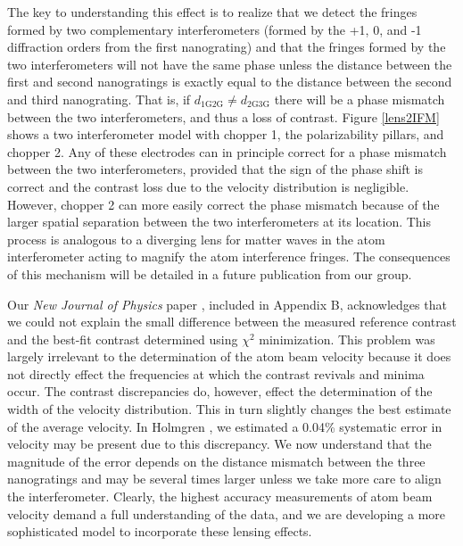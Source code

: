 The key to understanding this effect is to realize that we detect the fringes formed by two complementary interferometers (formed by the +1, 0, and -1 diffraction orders from the first nanograting) and that the fringes formed by the two interferometers will not have the same phase unless the distance between the first and second nanogratings is exactly equal to the distance between the second and third nanograting. That is, if $d_\textrm{1G2G} \neq d_\textrm{2G3G}$ there will be a phase mismatch between the two interferometers, and thus a loss of contrast. Figure \ref{lens2IFM} shows a two interferometer model with chopper 1, the polarizability pillars, and chopper 2. Any of these electrodes can in principle correct for a phase mismatch between the two interferometers, provided that the sign of the phase shift is correct and the contrast loss due to the velocity distribution is negligible. However, chopper 2 can more easily correct the phase mismatch because of the larger spatial separation between the two interferometers at its location. This process is analogous to a diverging lens for matter waves in the atom interferometer acting to magnify the atom interference fringes. The consequences of this mechanism will be detailed in a future publication from our group.


Our \emph{New Journal of Physics} paper \cite{Hol11}, included in Appendix B, acknowledges that we could not explain the small difference between the measured reference contrast and the best-fit contrast determined using $\chi^2$ minimization. This problem was largely irrelevant to the determination of the atom beam velocity because it does not directly effect the frequencies at which the contrast revivals and minima occur. The contrast discrepancies do, however, effect the determination of the width of the velocity distribution. This in turn slightly changes the best estimate of the average velocity. In Holmgren \etal \cite{Hol11}, we estimated a 0.04\% systematic error in velocity may be present due to this discrepancy. We now understand that the magnitude of the error depends on the distance mismatch between the three nanogratings and may be several times larger unless we take more care to align the interferometer. Clearly, the highest accuracy measurements of atom beam velocity demand a full understanding of the data, and we are developing a more sophisticated model to incorporate these lensing effects.



